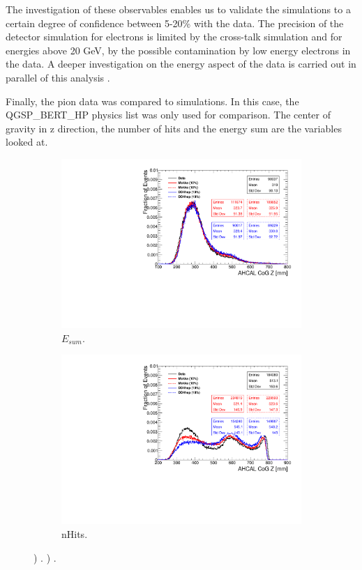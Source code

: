 The investigation of these observables enables us to validate the simulations to a certain degree of confidence between 5-20\% with the data. The precision of the detector simulation for electrons is limited by the cross-talk simulation and for energies above 20 GeV, by the possible contamination by low energy electrons in the data. A deeper investigation on the energy aspect of the data is carried out in parallel of this analysis \cite{AmbraEnergy}.

Finally, the pion data was compared to simulations. In this case, the QGSP\_BERT\_HP physics list was only used for comparison. The center of gravity in z direction, the number of hits and the energy sum are the variables looked at.

\begin{figure}[htbp!]
  \centering
  \begin{subfigure}[t]{0.49\textwidth}
    \includegraphics[width=1.\linewidth]{chap5/fig_AHCAL_Timing/Pions/Comparison_CoGZ_Xtalk_pions10GeV.pdf}
    \caption{$E_{sum}$.} \label{fig:pi10CoGZ}
  \end{subfigure}
  \hfill
  \begin{subfigure}[t]{0.49\textwidth}
    \includegraphics[width=1.\linewidth]{chap5/fig_AHCAL_Timing/Pions/Comparison_CoGZ_Xtalk_pions90GeV.pdf}
    \caption{nHits.} \label{fig:pi90CoGZ}
  \end{subfigure}
  \caption{) . ) .}
  \label{fig:piGoGZ}
\end{figure}

